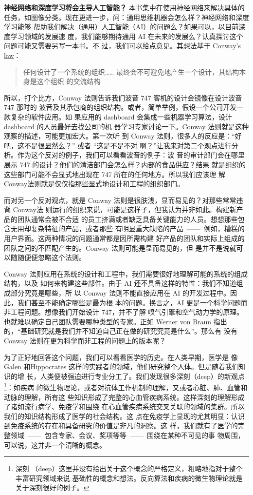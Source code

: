 \textbf{神经网络和深度学习将会主导人工智能？} 本书集中在使用神经网络来解决具体的
任务，如图像分类。现在更进一步，问：通用思维机器会怎么样？神经网络和深度学习能够
帮助我们解决（通用）人工智能（AI）的问题么？如果可以，以目前深度学习领域的发展速
度，我们能够期待通用 AI 在未来的发展么？认真探讨这个问题可能又需要另写一本书。不
过，我们可以给点意见。其想法基于
\href{http://en.wikipedia.org/wiki/Conway%27s_law}{Conway's law}：

\begin{quote}
任何设计了一个系统的组织…… 最终会不可避免地产生一个设计，其结构本身是这个组织
的交流结构
\end{quote}

所以，打个比方，Conway 法则告诉我们波音 747 客机的设计会镜像在设计波音 747 那时的
波音及其承包商的组织结构。或者，简单举例，假设一个公司开发一款复杂的软件应用。如
果应用的 dashboard 会集成一些机器学习算法，设计 dashboard 的人员最好去找公司的机
器学习专家讨论一下。Conway 法则就是这种观察的描述，可能更加宏大。第一次听
到 Conway 法则，很多人的反应是：“好吧，这不是很显然么？” 或者 “这是不是不对
啊？”让我来对第二个观点进行分析。作为这个反对的例子，我们可以看看波音的例子：波
音的审计部门会在哪里展示 747 的设计？他们的清洁部门会怎么样？内部的食品供应？结果
就是组织的这些部门可能不会显式地出现在 747 所在的任何地方。所以我们应该理
解 Conway法则就是仅仅指那些显式地设计和工程的组织部门。

而对另一个反对观点，就是 Conway 法则是很肤浅，显而易见的？对那些常常违背 Conway法
则运行的组织来说，可能是这样子，但我认为并非如此。构建新产品的团队通常会被不合适
的员工挤满或者缺乏具备关键能力的人员。想想那些包含无用却复杂特征的产品，或者那些
有明显重大缺陷的产品~——~例如，糟糕的用户界面。这两种情况的问题通常都是因所需构建
好产品的团队和实际上组成的团队之间的不匹配产生的。Conway 法则可能是显而易见的，但
是并不是说就可以随随便便忽略这个法则。

Conway 法则应用在系统的设计和工程中，我们需要很好地理解可能的系统的组成结构，以及
如何来构建这些部件。由于 AI 还不具备这样的特性：我们不知道组成部分究竟是哪些，所
以 Conway 法则不能直接应用在 AI 的开发过程中。因此，我们甚至不能确定哪些是最为根
本的问题。换言之，AI 更是一个科学问题而非工程问题。想像我们开始设计 747，并不了解
喷气引擎和空气动力学的原理。也就难以确定自己团队需要哪种类型的专家。正如 Werner
von Braun 指出的，“基础研究就是我们并不知道自己正在做的研究究竟是什么”。那么有
没有 Conway 法则在更为科学而非工程的问题上的版本呢？

为了正好地回答这个问题，我们可以看看医学的历史。在人类早期，医学是
像 Galen 和Hippocrates 这样的实践者的领域，他们研究整个人体。但是随着我们知识的增
长，人类便被强迫进行专业分工了。我们发现很多深刻（deep）的新观点\footnote{深刻
  （deep）这里并没有给出关于这个概念的严格定义，粗略地指对于整个丰富研究领域来说
  基础性的概念和想法。反向算法和疾病的微生物理论就是关于深刻很好的例子。}：如疾病
的微生物理论，或者对抗体工作机制的理解，又或者心脏、肺、血管和动脉的理解，所有这
些知识形成了完整的心血管疾病系统。这样深刻的理解形成了诸如流行病学、免疫学和围绕
在心血管疾病系统交叉关联的领域的集群。所以我们的知识结构形成了医学的社会结构。这
点在免疫学上显现的尤其明显：认识到免疫系统的存在和具备研究的价值是非凡的洞察。这
样，我们就有了医学的完整领域~——~包含专家、会议、奖项等等~——~围绕在某种不可见的事
物周围，可以说，这并非一个清晰的概念。

